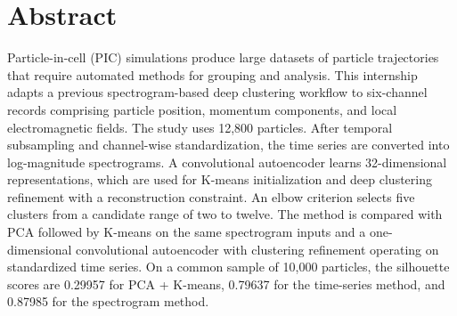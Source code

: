 \section*{Abstract}

Particle-in-cell (PIC) simulations produce large datasets of particle trajectories that require automated methods for grouping and analysis. This internship adapts a previous spectrogram-based deep clustering workflow to six-channel records comprising particle position, momentum components, and local electromagnetic fields. The study uses 12,800 particles. After temporal subsampling and channel-wise standardization, the time series are converted into log-magnitude spectrograms. A convolutional autoencoder learns 32-dimensional representations, which are used for K-means initialization and deep clustering refinement with a reconstruction constraint. An elbow criterion selects five clusters from a candidate range of two to twelve. The method is compared with PCA followed by K-means on the same spectrogram inputs and a one-dimensional convolutional autoencoder with clustering refinement operating on standardized time series. On a common sample of 10,000 particles, the silhouette scores are 0.29957 for PCA + K-means, 0.79637 for the time-series method, and 0.87985 for the spectrogram method.  